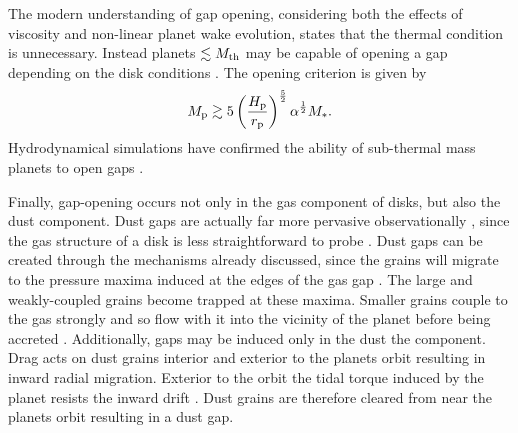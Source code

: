 The modern understanding of gap opening, considering both the effects of viscosity and non-linear planet wake evolution, states that the thermal condition is unnecessary.
Instead planets $\lesssim M_{\rm th}$ may be capable of opening a gap depending on the disk conditions \citep{rafikov2002}.
The opening criterion is given by \citep{kanagawa2015a}
\begin{align}
    M_{\rm p} \gtrsim 5 \left( \frac{H_{\rm p}}{r_{\rm p}} \right)^\frac{5}{2} \alpha^\frac{1}{2} M_*.
\end{align}
Hydrodynamical simulations have confirmed the ability of sub-thermal mass planets to open gaps \citep{duffell2013}.

Finally, gap-opening occurs not only in the gas component of disks, but also the dust component.
Dust gaps are actually far more pervasive observationally \citep[eg.][]{almapartnership2015,andrews2016,isella2016,andrews2018,huang2018b}, since the gas structure of a disk is less straightforward to probe \citep{miotello2022}.
Dust gaps can be created through the mechanisms already discussed, since the grains will migrate to the pressure maxima induced at the edges of the gas gap \citep{paardekooper2004}.
The large and weakly-coupled grains become trapped at these maxima.
Smaller grains couple to the gas strongly and so flow with it into the vicinity of the planet before being accreted \citep{paardekooper2006,fouchet2007}.
Additionally, gaps may be induced only in the dust the component.
Drag acts on dust grains interior and exterior to the planets orbit resulting in inward radial migration.
Exterior to the orbit the tidal torque induced by the planet resists the inward drift
\citep{dipierro2016}.
Dust grains are therefore cleared from near the planets orbit resulting in a dust gap.
